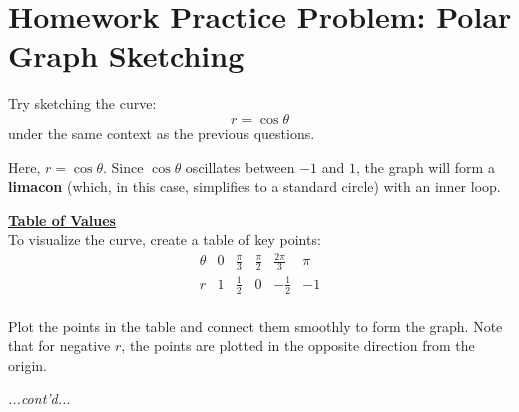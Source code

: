 \documentclass{article}
\begin{document}
\section*{Homework Practice Problem: Polar Graph Sketching}
\begin{exercisebox}
    Try sketching the curve:
    \[
        r = \cos\theta
    \]
    under the same context as the previous questions.
    
    \begin{solutionbox}
    Here, \( r = \cos\theta \). Since \( \cos\theta \) oscillates between \( -1 \) and \( 1 \), the graph will form a \textbf{limacon} (which, in this case, simplifies to a standard circle) with an inner loop.
    
    \begin{conceptbox}
        \textbf{\underline{Table of Values}} \\
        To visualize the curve, create a table of key points:
        \[
        \begin{array}{c|ccccc}
        \theta & 0 & \frac{\pi}{3} & \frac{\pi}{2} & \frac{2\pi}{3} & \pi \\
        \hline
        r & 1 & \frac{1}{2} & 0 & -\frac{1}{2} & -1 \\
        \end{array}
        \]
        
        \begin{notebox}
            Plot the points in the table and connect them smoothly to form the graph. Note that for negative \( r \), the points are plotted in the opposite direction from the origin.
        \end{notebox}
    \end{conceptbox}
    \textit{...cont'd...}
    \end{solutionbox}
\end{exercisebox}
\end{document}
